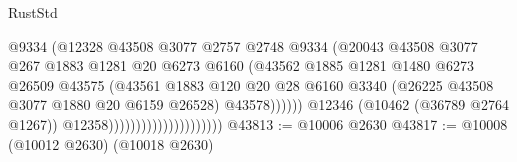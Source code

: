 \begin{lexlean}{RustStd}
\begin{coremodule}
                                                  @9334
                                                  (@12328
                                                    @43508
                                                    @3077
                                                    @2757
                                                    @2748
                                                    @9334
                                                    (@20043
                                                      @43508
                                                      @3077
                                                      @267
                                                      @1883
                                                      @1281
                                                      @20
                                                      @6273
                                                      @6160
                                                      (@43562
                                                        @1885
                                                        @1281
                                                        @1480
                                                        @6273
                                                        @26509
                                                        @43575
                                                        (@43561
                                                          @1883
                                                          @120
                                                          @20
                                                          @28
                                                          @6160
                                                          @3340
                                                          (@26225
                                                            @43508
                                                            @3077
                                                            @1880
                                                            @20
                                                            @6159
                                                            @26528)
                                                          @43578))))))
                                              @12346
                                              (@10462 (@36789 @2764 @1267))
                                              @12358)))))))))))))))))))))
@43813 := @10006 @2630
@43817 := @10008 (@10012 @2630) (@10018 @2630)

\end{coremodule}
\end{lexlean}
